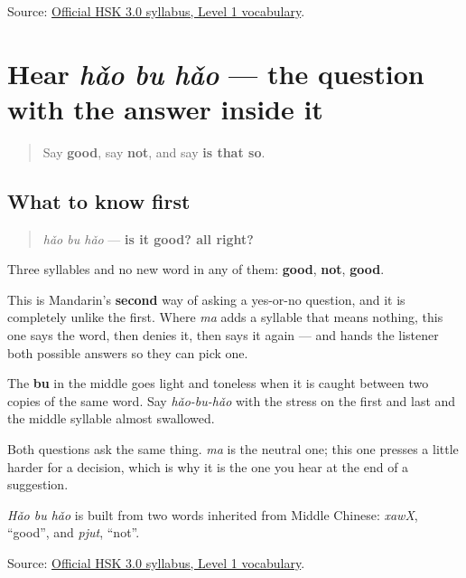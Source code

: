 \begin{tcolorbox}[breakable,colback=teal!4,colframe=teal!35!black,title={Before you move on}]
Source: \href{https://hsk.cn-bj.ufileos.com/3.0/\%E6\%96\%B0\%E7\%89\%88HSK\%E8\%80\%83\%E8\%AF\%95\%E5\%A4\%A7\%E7\%BA\%B21219.pdf}{Official HSK 3.0 syllabus, Level 1 vocabulary}.
\end{tcolorbox}
\section[hǎo bu hǎo]{Hear \emph{hǎo bu hǎo} — the question with the answer inside it}

\label{lesson:ZH-C19-hear-haobuhao}



\begin{quote}
Say \textbf{good}, say \textbf{not}, and say \textbf{is that so}.
\end{quote}

\subsection*{What to know first}
\begin{quote}
\emph{hǎo bu hǎo} — \textbf{is it good? all right?}
\end{quote}

Three syllables and no new word in any of them: \textbf{good}, \textbf{not}, \textbf{good}.

This is Mandarin's \textbf{second} way of asking a yes-or-no question, and it is completely unlike the first. Where \emph{ma} adds a syllable that means nothing, this one says the word, then denies it, then says it again — and hands the listener both possible answers so they can pick one.

The \textbf{bu} in the middle goes light and toneless when it is caught between two copies of the same word. Say \emph{hǎo-bu-hǎo} with the stress on the first and last and the middle syllable almost swallowed.

Both questions ask the same thing. \emph{ma} is the neutral one; this one presses a little harder for a decision, which is why it is the one you hear at the end of a suggestion.

\emph{Hǎo bu hǎo} is built from two words inherited from Middle Chinese: \emph{xawX}, \textquotedblleft{}good\textquotedblright{}, and \emph{pjut}, \textquotedblleft{}not\textquotedblright{}.

\begin{tcolorbox}[breakable,colback=teal!4,colframe=teal!35!black,title={Before you move on}]
Source: \href{https://hsk.cn-bj.ufileos.com/3.0/\%E6\%96\%B0\%E7\%89\%88HSK\%E8\%80\%83\%E8\%AF\%95\%E5\%A4\%A7\%E7\%BA\%B21219.pdf}{Official HSK 3.0 syllabus, Level 1 vocabulary}.
\end{tcolorbox}
